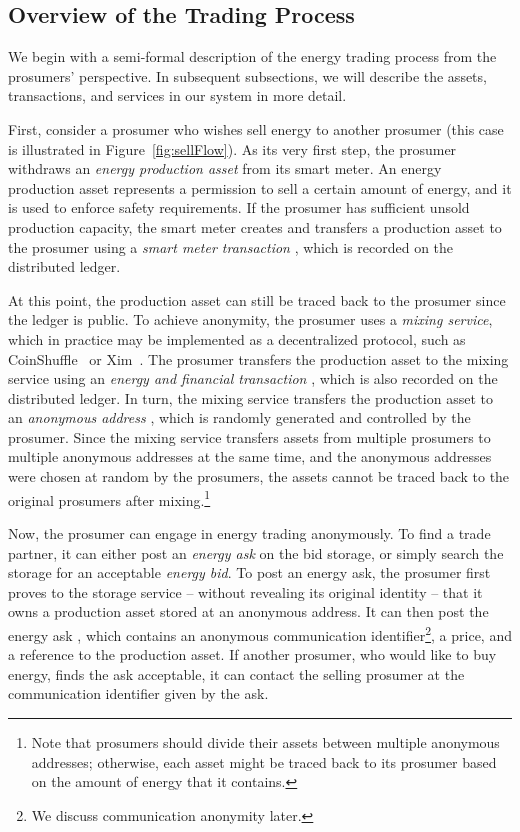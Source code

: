 \subsection{Overview of the Trading Process}
We begin with a semi-formal description of the energy trading process from the prosumers' perspective.
In subsequent subsections, we will describe the assets, transactions, and services in our system in more detail.

First, consider a prosumer who wishes sell energy to another prosumer (this case is illustrated in Figure~\ref{fig:sellFlow}).
As its very first step, the prosumer withdraws an \emph{energy production asset} from its smart meter.
An energy production asset represents a permission to sell a certain amount of energy, and it is used to enforce safety requirements.
If the prosumer has sufficient unsold production capacity, the smart meter creates and transfers a production asset to the prosumer using a \emph{smart meter transaction} , which is recorded on the distributed ledger.

At this point, the production asset can still be traced back to the prosumer since the ledger is public.
To achieve anonymity, the prosumer uses a \emph{mixing service}, which in practice may be implemented as a decentralized protocol, such as CoinShuffle~\cite{ruffing2014coinshuffle} or Xim~\cite{bissias2014sybil}.
The prosumer transfers the production asset to the mixing service using an \emph{energy and financial transaction} , which is also recorded on the distributed ledger.
In turn, the mixing service transfers the production asset to an \emph{anonymous address} , which is randomly generated and controlled by the prosumer.
Since the mixing service transfers assets from multiple prosumers to multiple anonymous addresses at the same time, and the anonymous addresses were chosen at random by the prosumers, the assets cannot be traced back to the original prosumers after mixing.\footnote{Note that prosumers should divide their assets between multiple anonymous addresses; otherwise, each asset might be traced back to its prosumer based on the amount of energy that it contains.}

Now, the prosumer can engage in energy trading anonymously.
To find a trade partner, it can either post an \emph{energy ask} on the bid storage, or simply search the storage for an acceptable \emph{energy bid}.
To post an energy ask, the prosumer first proves to the storage service -- without revealing its original identity -- that it owns a production asset stored at an anonymous address.
It can then post the energy ask , which contains an anonymous communication identifier\footnote{We discuss communication anonymity later.}, a price, and a reference to the production asset.
If another prosumer, who would like to buy energy, finds the ask acceptable, it can contact the selling prosumer at the communication identifier given by the ask.

